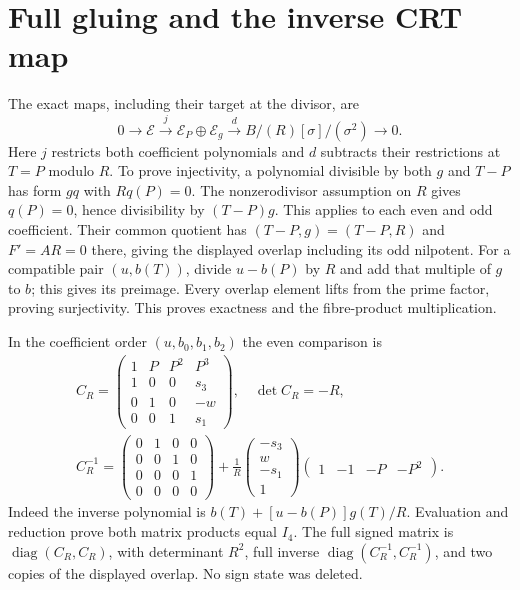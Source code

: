 \documentclass[11pt]{article}
\newcommand{\diag}{\operatorname{diag}}
\begin{document}
\section{Full gluing and the inverse CRT map}
The exact maps, including their target at the divisor, are
\begin{equation}
 0\longrightarrow\mathscr E\xrightarrow{j}\mathscr E_P\oplus\mathscr E_g
 \xrightarrow{d} B/(R)[\sigma]/(\sigma^2)\longrightarrow0.
 \tag{ECC3}
\end{equation}
Here $j$ restricts both coefficient polynomials and $d$ subtracts their
restrictions at $T=P$ modulo $R$. To prove injectivity, a polynomial
divisible by both $g$ and $T-P$ has form $gq$ with $R q(P)=0$.
The nonzerodivisor assumption on $R$ gives $q(P)=0$, hence divisibility by
$(T-P)g$. This applies to each even and odd coefficient. Their common
quotient has $(T-P,g)=(T-P,R)$ and $F'=AR=0$ there, giving the displayed
overlap including its odd nilpotent. For a compatible pair $(u,b(T))$,
divide $u-b(P)$ by $R$ and add that multiple of $g$ to $b$; this gives its
preimage. Every overlap element lifts from the prime factor, proving
surjectivity. This proves exactness and the fibre-product multiplication.

In the coefficient order $(u,b_0,b_1,b_2)$ the even comparison is
\begin{equation}
 \begin{gathered}
 C_R=\begin{pmatrix}1&P&P^2&P^3\\1&0&0&s_3\\
 0&1&0&-w\\0&0&1&s_1\end{pmatrix},\quad
 \det C_R=-R,\\
 C_R^{-1}=\begin{pmatrix}0&1&0&0\\0&0&1&0\\0&0&0&1\\0&0&0&0\end{pmatrix}
 +\frac1R\begin{pmatrix}-s_3\\w\\-s_1\\1\end{pmatrix}
             \begin{pmatrix}1&-1&-P&-P^2\end{pmatrix}.
 \end{gathered}
 \tag{ECC4}
\end{equation}
Indeed the inverse polynomial is
$b(T)+[u-b(P)]g(T)/R$. Evaluation and reduction prove both matrix products
equal $I_4$. The full signed matrix is $\diag(C_R,C_R)$, with determinant
$R^2$, full inverse $\diag(C_R^{-1},C_R^{-1})$, and two copies of the
displayed overlap. No sign state was deleted.
\end{document}
